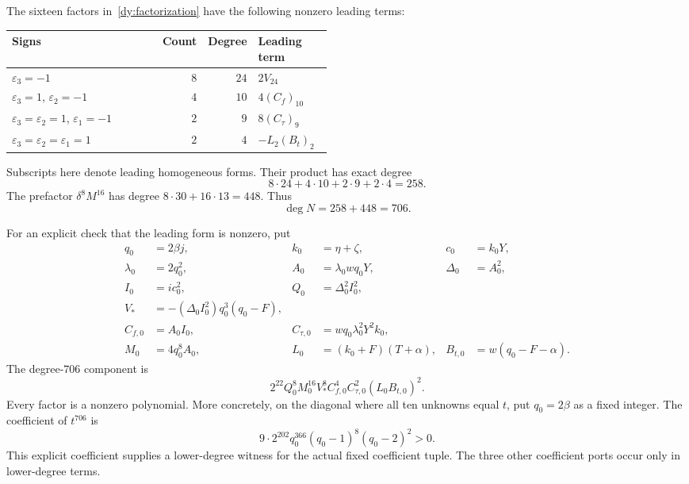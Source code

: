 The sixteen factors in~\eqref{dy:factorization} have the following
nonzero leading terms:
\begin{center}
\begin{tabular}{@{}p{0.47\linewidth}rrl@{}}
\toprule
Signs & Count & Degree & Leading term\\
\midrule
$\varepsilon_3=-1$ & $8$ & $24$ & $2V_{24}$\\
$\varepsilon_3=1$, $\varepsilon_2=-1$ & $4$ & $10$ & $4(C_f)_{10}$\\
$\varepsilon_3=\varepsilon_2=1$, $\varepsilon_1=-1$
    & $2$ & $9$ & $8(C_\tau)_9$\\
$\varepsilon_3=\varepsilon_2=\varepsilon_1=1$
    & $2$ & $4$ & $-L_2(B_t)_2$\\
\bottomrule
\end{tabular}
\end{center}
Subscripts here denote leading homogeneous forms.  Their product has
exact degree
\[
 8\cdot24+4\cdot10+2\cdot9+2\cdot4=258.
\]
The prefactor $\delta^8M^{16}$ has degree
$8\cdot30+16\cdot13=448$.  Thus
\begin{equation}
 \deg N=258+448=706.
 \label{dy:exactdegree}
\end{equation}

For an explicit check that the leading form is nonzero, put
\begin{align*}
 q_0&=2\beta j,& k_0&=\eta+\zeta,& c_0&=k_0Y,\\
 \lambda_0&=2q_0^2,& A_0&=\lambda_0wq_0Y,&\Delta_0&=A_0^2,\\
 I_0&=ic_0^2,& Q_0&=\Delta_0^2I_0^2,\\
 V_*&=-(\Delta_0I_0^2)q_0^3(q_0-F),\\
 C_{f,0}&=A_0I_0,&
 C_{\tau,0}&=wq_0\lambda_0^2Y^2k_0,\\
 M_0&=4q_0^8A_0,& L_0&=(k_0+F)(T+\alpha),&
 B_{t,0}&=w(q_0-F-\alpha).
\end{align*}
The degree-$706$ component is
\begin{equation}
 2^{22}Q_0^8M_0^{16}V_*^8C_{f,0}^4C_{\tau,0}^2
                    (L_0B_{t,0})^2.
 \label{dy:leadingform}
\end{equation}
Every factor is a nonzero polynomial.  More concretely, on the diagonal
where all ten unknowns equal $t$, put $q_0=2\beta$ as a fixed integer.
The coefficient of $t^{706}$ is
\begin{equation}
 9\cdot2^{202}q_0^{366}(q_0-1)^8(q_0-2)^2>0.
 \label{dy:diagonal}
\end{equation}
This explicit coefficient supplies a lower-degree witness for the actual
fixed coefficient tuple.  The three other coefficient ports occur only
in lower-degree terms.

